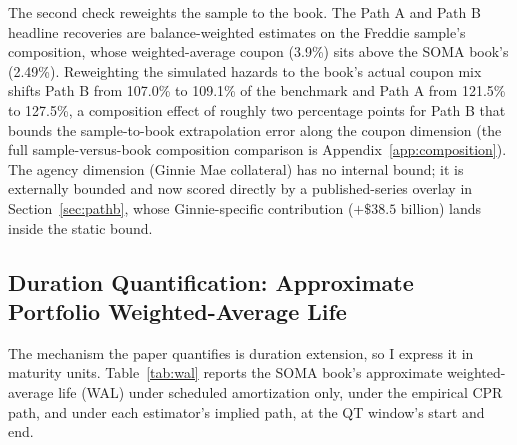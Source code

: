\documentclass[12pt]{article}
\begin{document}
The second check reweights the sample to the book. The Path A and Path B headline recoveries are balance-weighted estimates on the Freddie sample's composition, whose weighted-average coupon (3.9\%) sits above the SOMA book's (2.49\%). Reweighting the simulated hazards to the book's actual coupon mix shifts Path B from 107.0\% to 109.1\% of the benchmark and Path A from 121.5\% to 127.5\%, a composition effect of roughly two percentage points for Path B that bounds the sample-to-book extrapolation error along the coupon dimension (the full sample-versus-book composition comparison is Appendix~\ref{app:composition}). The agency dimension (Ginnie Mae collateral) has no internal bound; it is externally bounded and now scored directly by a published-series overlay in Section~\ref{sec:pathb}, whose Ginnie-specific contribution ($+\$38.5$ billion) lands inside the static bound.

\subsection{Duration Quantification: Approximate Portfolio Weighted-Average Life}\label{sec:robustness-wal}

The mechanism the paper quantifies is duration extension, so I express it in maturity units. Table~\ref{tab:wal} reports the SOMA book's approximate weighted-average life (WAL) under scheduled amortization only, under the empirical CPR path, and under each estimator's implied path, at the QT window's start and end.
\end{document}
